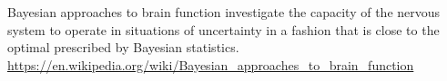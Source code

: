 \documentclass[a4paper]{article}
\title{}
\date{}
\begin{document}
    \maketitle
    Bayesian approaches to brain function investigate the capacity of the nervous system to operate in situations of uncertainty in a fashion that is close to the optimal prescribed by Bayesian statistics. \url{https://en.wikipedia.org/wiki/Bayesian_approaches_to_brain_function}
\end{document}
